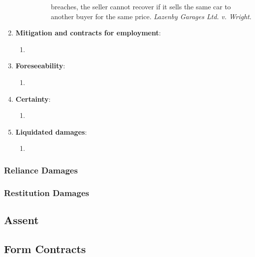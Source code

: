 \begin{enumerate}
\begin{enumerate}
\begin{enumerate}
\begin{enumerate}
                breaches, the seller cannot recover if it sells the same car 
                to another buyer for the same price. \emph{Lazenby Garages 
                Ltd. v. Wright}.
            \end{enumerate}
        \end{enumerate}
    \end{enumerate}
    \item \textbf{Mitigation and contracts for employment}:
    \begin{enumerate}
        \item %
    \end{enumerate}
    \item \textbf{Foreseeability}:
    \begin{enumerate}
        \item %
    \end{enumerate}
    \item \textbf{Certainty}:
    \begin{enumerate}
        \item %
    \end{enumerate}
    \item \textbf{Liquidated damages}:
    \begin{enumerate}
        \item %
    \end{enumerate}
\end{enumerate}

\subsubsection{Reliance Damages}


\subsubsection{Restitution Damages}


\subsection{Assent}


\subsection{Form Contracts}


